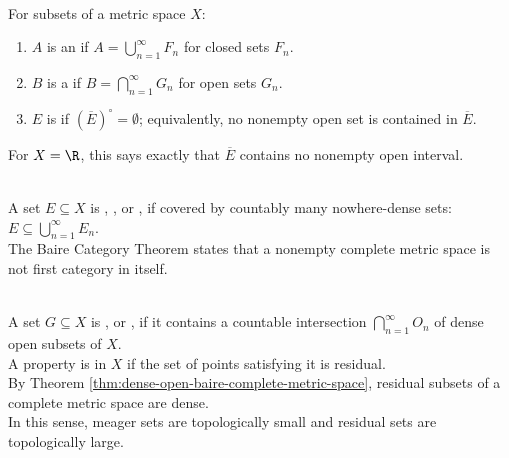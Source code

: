 \begin{definition} \label{def:fsigma-gdelta-nowhere-dense} \\
For subsets of a metric space $X$:
\begin{enumerate}[label=(\roman*)]
\setlength{\itemsep}{0pt}
\item $A$ is an  if $A=\bigcup_{n=1}^{\infty}F_n$ for closed sets $F_n$.
\item $B$ is a  if $B=\bigcap_{n=1}^{\infty}G_n$ for open sets $G_n$.
\item $E$ is  if $(\overline{E})^\circ=\emptyset$; equivalently, no nonempty open set is contained in $\overline{E}$.
\end{enumerate}
For $X=\R$, this says exactly that $\overline{E}$ contains no nonempty open interval.
\end{definition}

\begin{definition} \label{def:first-category-set} \\
A set $E\subseteq X$ is , , or , if covered by countably many nowhere-dense sets: $E\subseteq \bigcup\limits_{n=1}^{\infty}E_n$.\\
The Baire Category Theorem states that a nonempty complete metric space is not first category in itself.
\end{definition}

\begin{definition} \label{def:residual-thick-generic-set} \\
A set $G\subseteq X$ is , or , if it contains a countable intersection $\bigcap\limits_{n=1}^{\infty}O_n$ of dense open subsets of $X$.\\
A property is  in $X$ if the set of points satisfying it is residual.\\
By Theorem \ref{thm:dense-open-baire-complete-metric-space}, residual subsets of a complete metric space are dense.\\
In this sense, meager sets are topologically small and residual sets are topologically large.
\end{definition}

